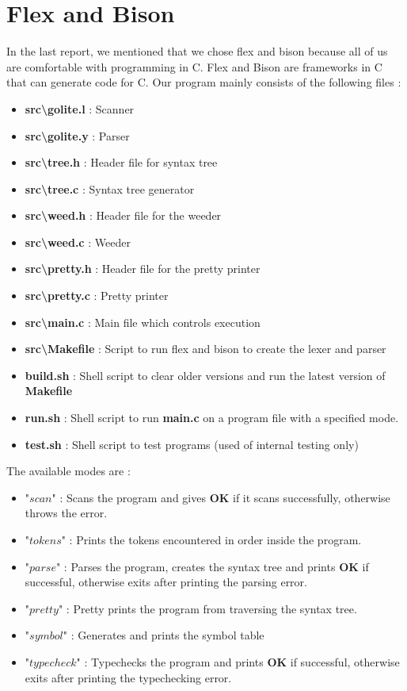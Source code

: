 \documentclass[preprint,12pt]{elsarticle}
\begin{document}
\section{Flex and Bison}

In the last report, we mentioned that we chose flex and bison because all of us are comfortable with programming in C. Flex and Bison are frameworks in C that can generate code for C. Our program mainly consists of the following files : 
\begin{itemize}
\item \textbf{src\textbackslash golite.l} : Scanner
\item \textbf{src\textbackslash golite.y} : Parser
\item \textbf{src\textbackslash tree.h} : Header file for syntax tree
\item \textbf{src\textbackslash tree.c} : Syntax tree generator
\item \textbf{src\textbackslash weed.h} : Header file for the weeder
\item \textbf{src\textbackslash weed.c} : Weeder
\item \textbf{src\textbackslash pretty.h} : Header file for the pretty printer
\item \textbf{src\textbackslash pretty.c} : Pretty printer
\item \textbf{src\textbackslash main.c} : Main file which controls execution
\item \textbf{src\textbackslash Makefile} : Script to run flex and bison to create the lexer and parser
\item \textbf{build.sh} : Shell script to clear older versions and run the latest version of \textbf{Makefile}
\item \textbf{run.sh} : Shell script to run \textbf{main.c} on a program file with a specified mode.
\item \textbf{test.sh} : Shell script to test programs (used of internal testing only)
\end{itemize}

The available modes are : 
\begin{itemize}
\item "$scan$" : Scans the program and gives \textbf{OK} if it scans successfully, otherwise throws the error.
\item "$tokens$" : Prints the tokens encountered in order inside the program.
\item "$parse$" : Parses the program, creates the syntax tree and prints \textbf{OK} if successful, otherwise exits after printing the parsing error.
\item "$pretty$" : Pretty prints the program from traversing the syntax tree.
\item "$symbol$" : Generates and prints the symbol table
\item "$typecheck$" : Typechecks the program and prints \textbf{OK} if successful, otherwise exits after printing the typechecking error.
\end{itemize}
\end{document}
